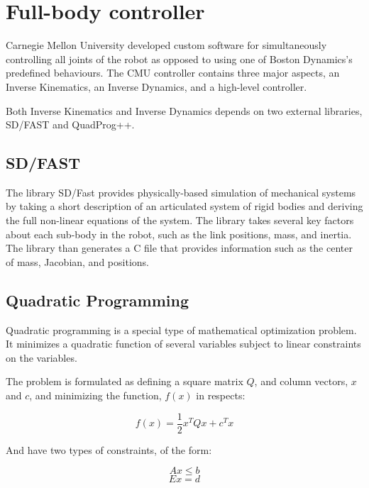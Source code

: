 \documentclass[12pt]{report}
\begin{document}
\section{Full-body controller}
Carnegie Mellon University developed custom software for simultaneously controlling all joints of the robot as opposed to using one of Boston Dynamics's predefined behaviours. The CMU controller contains three major aspects, an Inverse Kinematics, an Inverse Dynamics, and a high-level controller. 

Both Inverse Kinematics and Inverse Dynamics depends on two external libraries, SD/FAST and QuadProg++. 

\subsection{SD/FAST}
The library SD/Fast provides physically-based simulation of mechanical systems by taking a short description of an articulated system of rigid bodies and deriving the full non-linear equations of the system. \cite{sdfast} The library takes several key factors about each sub-body in the robot, such as the link positions, mass, and inertia. The library than generates a C file that provides information such as the center of mass, Jacobian, and positions.



\subsection{Quadratic Programming}

Quadratic programming is a special type of mathematical optimization problem. It minimizes a quadratic function of several variables subject to linear constraints on the variables. 

The problem is formulated as defining a square matrix $Q$, and column vectors, $x$ and $c$, and minimizing the function, $f(x)$ in respects:

\begin{equation} 
f(x) = \frac{1}{2}x^TQx + c^Tx
\end{equation}

And have two types of constraints, of the form:

\begin{equation} 
Ax \le b 
\end{equation}
\begin{equation} 
Ex = d 
\end{equation}
\end{document}
